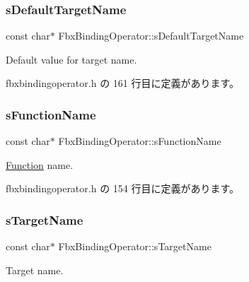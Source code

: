 \subsubsection{\texorpdfstring{s\+Default\+Target\+Name}{sDefaultTargetName}}
{\footnotesize\ttfamily const char$\ast$ Fbx\+Binding\+Operator\+::s\+Default\+Target\+Name\hspace{0.3cm}{\ttfamily [static]}}



Default value for target name. 



 fbxbindingoperator.\+h の 161 行目に定義があります。

\mbox{\label{class_fbx_binding_operator_ac905ce728f7bfb5bd7becf78af8a5c4d}} 
\subsubsection{\texorpdfstring{s\+Function\+Name}{sFunctionName}}
{\footnotesize\ttfamily const char$\ast$ Fbx\+Binding\+Operator\+::s\+Function\+Name\hspace{0.3cm}{\ttfamily [static]}}



\hyperlink{class_fbx_binding_operator_1_1_function}{Function} name. 



 fbxbindingoperator.\+h の 154 行目に定義があります。

\mbox{\label{class_fbx_binding_operator_ac53f7653f20364486e319b64b275ed4b}} 
\subsubsection{\texorpdfstring{s\+Target\+Name}{sTargetName}}
{\footnotesize\ttfamily const char$\ast$ Fbx\+Binding\+Operator\+::s\+Target\+Name\hspace{0.3cm}{\ttfamily [static]}}



Target name. 



